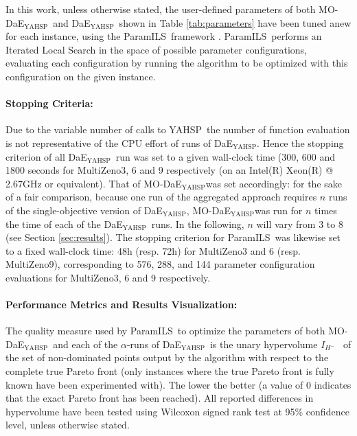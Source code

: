 \documentclass{llncs}
\newcommand{\DAEYAHSP}{{\sc DaE$_{\text{YAHSP}}$}}
\def\YAHSP{{\sc YAHSP}}
\def\MULTIZENO{{\sc MultiZeno}}
\def\PARAMILS{{\sc ParamILS}}
\def\MODAEYAHSP{{\sc MO-DaE$_{\text{YAHSP}}$}}
\begin{document}
In this work, unless otherwise stated, the user-defined parameters of both \MODAEYAHSP\ and \DAEYAHSP\ shown in Table \ref{tab:parameters} have been tuned anew for each instance, using the \PARAMILS\ framework
\cite{ParamILS-JAIR}. \PARAMILS\ performs an Iterated Local Search in the space of possible parameter configurations, evaluating each configuration by running the algorithm to be optimized with this configuration on the given instance. 

\paragraph{Stopping Criteria:} Due to the variable number of calls to \YAHSP\, the number of function evaluation is not representative of the CPU effort of runs of \DAEYAHSP. Hence the stopping criterion of all \DAEYAHSP\ run was set to a given wall-clock time (300, 600 and 1800 seconds for \MULTIZENO3, 6 and 9 respectively (on an Intel(R) Xeon(R) @ 2.67GHz or equivalent). That of \MODAEYAHSP was set accordingly: for the sake of a fair comparison, because one run of the aggregated approach requires $n$ runs of the single-objective version of \DAEYAHSP, \MODAEYAHSP was run for $n$ times the time of each of the \DAEYAHSP\ runs. In the following, $n$ will vary from $3$ to $8$ (see Section \ref{sec:results}). The stopping criterion for \PARAMILS\ was likewise set to a fixed wall-clock time: 48h (resp. 72h) for \MULTIZENO3 and 6 (resp. \MULTIZENO9), corresponding to 576, 288, and 144 parameter configuration evaluations for \MULTIZENO3, 6 and 9 respectively.

\paragraph{Performance Metrics and Results Visualization:} The quality measure used by \PARAMILS\ to optimize the parameters of both \MODAEYAHSP\ and each of the $\alpha$-runs of \DAEYAHSP\ is the unary hypervolume  $I_{H^-}$~\cite{Zitzler2004} of the set of non-dominated points output by the algorithm with respect to the complete true Pareto front (only instances where the true Pareto front is fully known have been experimented with). The lower the better (a value of 0 indicates that the exact Pareto front has been reached). All reported differences in hypervolume have been tested using Wilcoxon signed rank test at 95\% confidence level, unless otherwise stated.
\end{document}

